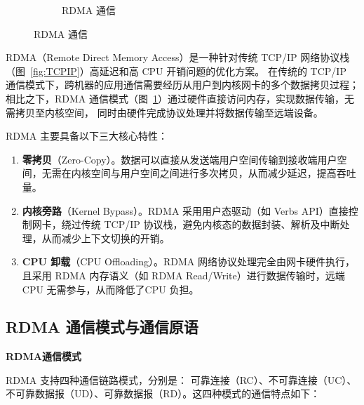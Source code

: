 {\begin{figure}[!htbp]
\begin{subfigure}[b]{0.50\textwidth}
            \caption{RDMA 通信}
            \label{fig:RDMA}
        \end{subfigure}
        \label{fig:DMA-RDMA}
    \end{figure}

    RDMA（Remote Direct Memory Access）是一种针对传统 TCP/IP 网络协议栈（图~\ref{fig:TCPIP}）高延迟和高 CPU 开销问题的优化方案。
    在传统的 TCP/IP 通信模式下，跨机器的应用通信需要经历从用户到内核网卡的多个数据拷贝过程；
    相比之下，RDMA 通信模式（图~\ref{fig:RDMA}）通过硬件直接访问内存，实现数据传输，无需拷贝至内核空间，
    同时由硬件完成协议处理并将数据传输至远端设备。

    RDMA 主要具备以下三大核心特性：
    \begin{enumerate}[label=\arabic*.]
        \item \textbf{零拷贝}（Zero-Copy）。数据可以直接从发送端用户空间传输到接收端用户空间，无需在内核空间与用户空间之间进行多次拷贝，从而减少延迟，提高吞吐量。
        \item \textbf{内核旁路}（Kernel Bypass）。RDMA 采用用户态驱动（如 Verbs API）直接控制网卡，绕过传统 TCP/IP 协议栈，避免内核态的数据封装、解析及中断处理，从而减少上下文切换的开销。
        \item \textbf{CPU 卸载}（CPU Offloading）。RDMA 网络协议处理完全由网卡硬件执行，
              且采用 RDMA 内存语义（如 RDMA Read/Write）进行数据传输时，远端 CPU 无需参与，从而降低了CPU 负担。
    \end{enumerate}

    \subsection{RDMA 通信模式与通信原语}

    \textbf{RDMA通信模式}

    RDMA 支持四种通信链路模式，分别是：
    可靠连接（RC）、不可靠连接（UC）、不可靠数据报（UD）、可靠数据报（RD）。这四种模式的通信特点如下：


}
